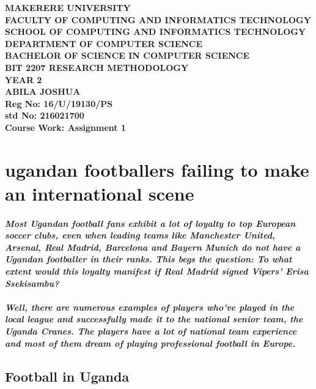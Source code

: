 \documentclass[a4paper,12pt]{article}
\begin{document}
\begin{Huge}
\begin{center}
\begin{normalsize}

\textbf{MAKERERE UNIVERSITY } \\
\textbf{FACULTY OF COMPUTING AND INFORMATICS TECHNOLOGY} \\
\textbf{SCHOOL OF COMPUTING AND INFORMATICS TECHNOLOGY} \\
\textbf{DEPARTMENT OF COMPUTER SCIENCE} \\
\textbf{BACHELOR OF SCIENCE IN COMPUTER SCIENCE} \\
\textbf{BIT 2207 RESEARCH METHODOLOGY} \\
\textbf{YEAR 2} \\
\textbf{\sc ABILA JOSHUA } \\
\textbf{\sc Reg No: 16/U/19130/PS } \\
\textbf{\sc std No: 216021700}\\
\textbf{\sc Course Work: Assignment 1}\\
\end{normalsize}
\end{center}
\end{Huge}
\newpage

\section{\sc ugandan footballers failing to make an international scene}
\paragraph{\sl Most Ugandan football fans exhibit a lot of loyalty to top European soccer clubs, even when leading teams like Manchester United, Arsenal, Real Madrid, Barcelona and Bayern Munich do not have a Ugandan footballer in their ranks. This begs the question: To what extent would this loyalty manifest if Real Madrid signed Vipers’ Erisa Ssekisambu?}
\paragraph{\sl Well, there are numerous examples of players who’ve played in the local league and successfully made it to the national senior team, the Uganda Cranes. The players have a lot of national team experience and most of them dream of playing professional football in Europe.}
\subsection{\sc Football in Uganda}
\end{document}
